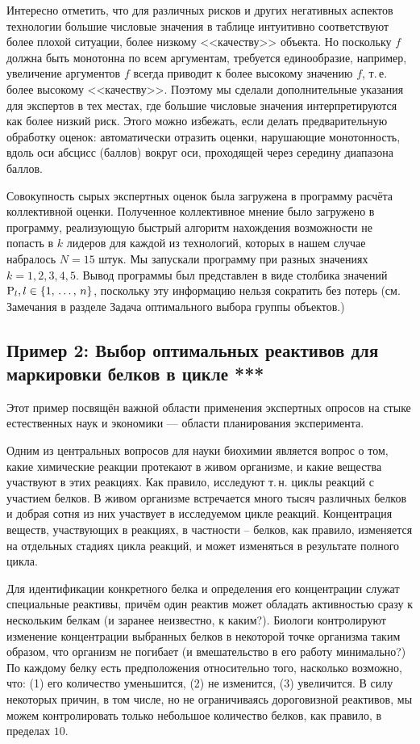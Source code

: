 Интересно отметить, что для различных рисков и других негативных аспектов технологии большие числовые значения в таблице интуитивно соответствуют более плохой ситуации, более низкому <<качеству>> объекта. Но поскольку $f$ должна быть монотонна по всем аргументам, требуется единообразие, например, увеличение аргументов $f$  всегда приводит к более высокому значению $f$, т.\,е. более высокому <<качеству>>. Поэтому мы сделали дополнительные указания для экспертов в тех местах, где большие числовые значения интерпретируются как более низкий риск. Этого можно избежать, если делать предварительную обработку оценок: автоматически отразить оценки, нарушающие монотонность, вдоль оси абсцисс (баллов) вокруг оси, проходящей через середину диапазона баллов.

Совокупность сырых экспертных оценок была загружена в программу расчёта коллективной оценки. Полученное коллективное мнение было загружено в программу, реализующую быстрый алгоритм нахождения возможности не попасть в $k$ лидеров для каждой из технологий, которых в нашем случае набралось $N = 15$ штук. Мы запускали программу при разных значениях $k = 1, 2, 3, 4, 5$. Вывод программы был представлен в виде столбика значений ${\mathrm{P}}_l, l \in \{1,\, \ldots,\, n\}$, поскольку эту информацию нельзя сократить без потерь (см. Замечания в разделе Задача оптимального выбора группы объектов.)

\subsection{Пример 2: Выбор оптимальных реактивов для маркировки белков в цикле ***}

Этот пример посвящён важной области применения экспертных опросов на стыке естественных наук и экономики --- области планирования эксперимента. 

Одним из центральных вопросов для науки биохимии является вопрос о том, какие химические реакции протекают в живом организме, и какие вещества участвуют в этих реакциях. Как правило, исследуют т.\,н. циклы реакций с участием белков. В живом организме встречается много тысяч различных белков и добрая сотня из них участвует в исследуемом цикле реакций. Концентрация веществ, участвующих в реакциях, в частности -- белков, как правило, изменяется на отдельных стадиях цикла реакций, и может изменяться в результате полного цикла.

Для идентификации конкретного белка и определения его концентрации служат специальные реактивы, причём один реактив может обладать активностью сразу к нескольким белкам (и заранее неизвестно, к каким?). Биологи контролируют изменение концентрации выбранных белков в некоторой точке организма таким образом, что организм не погибает (и вмешательство в его работу минимально?) По каждому белку есть предположения относительно того, насколько возможно, что: (1) его количество уменьшится, (2) не изменится, (3) увеличится. В силу некоторых причин, в том числе, но не ограничиваясь дороговизной реактивов, мы можем контролировать только небольшое количество белков, как правило, в пределах $10$.

